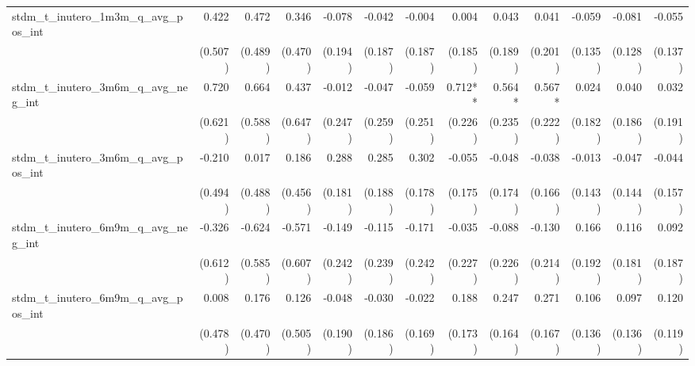 \begin{tabular}{lrrrrrrrrrrrr}
stdm\_t\_inutero\_1m3m\_q\_avg\_pos\_int    &        0.422 &        0.472 &        0.346 &       -0.078 &       -0.042 &       -0.004 &        0.004 &        0.043 &        0.041 &       -0.059 &       -0.081 &       -0.055 \\ 
                                            &      (0.507) &      (0.489) &      (0.470) &      (0.194) &      (0.187) &      (0.187) &      (0.185) &      (0.189) &      (0.201) &      (0.135) &      (0.128) &      (0.137) \\ 
stdm\_t\_inutero\_3m6m\_q\_avg\_neg\_int    &        0.720 &        0.664 &        0.437 &       -0.012 &       -0.047 &       -0.059 &      0.712** &       0.564* &       0.567* &        0.024 &        0.040 &        0.032 \\ 
                                            &      (0.621) &      (0.588) &      (0.647) &      (0.247) &      (0.259) &      (0.251) &      (0.226) &      (0.235) &      (0.222) &      (0.182) &      (0.186) &      (0.191) \\ 
stdm\_t\_inutero\_3m6m\_q\_avg\_pos\_int    &       -0.210 &        0.017 &        0.186 &        0.288 &        0.285 &        0.302 &       -0.055 &       -0.048 &       -0.038 &       -0.013 &       -0.047 &       -0.044 \\ 
                                            &      (0.494) &      (0.488) &      (0.456) &      (0.181) &      (0.188) &      (0.178) &      (0.175) &      (0.174) &      (0.166) &      (0.143) &      (0.144) &      (0.157) \\ 
stdm\_t\_inutero\_6m9m\_q\_avg\_neg\_int    &       -0.326 &       -0.624 &       -0.571 &       -0.149 &       -0.115 &       -0.171 &       -0.035 &       -0.088 &       -0.130 &        0.166 &        0.116 &        0.092 \\ 
                                            &      (0.612) &      (0.585) &      (0.607) &      (0.242) &      (0.239) &      (0.242) &      (0.227) &      (0.226) &      (0.214) &      (0.192) &      (0.181) &      (0.187) \\ 
stdm\_t\_inutero\_6m9m\_q\_avg\_pos\_int    &        0.008 &        0.176 &        0.126 &       -0.048 &       -0.030 &       -0.022 &        0.188 &        0.247 &        0.271 &        0.106 &        0.097 &        0.120 \\ 
                                            &      (0.478) &      (0.470) &      (0.505) &      (0.190) &      (0.186) &      (0.169) &      (0.173) &      (0.164) &      (0.167) &      (0.136) &      (0.136) &      (0.119) \\ 

\end{tabular}
